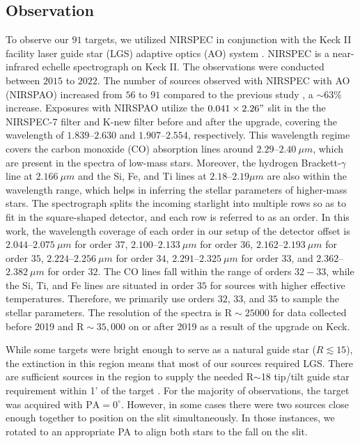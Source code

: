 \documentclass[12pt]{ucsddissertation}
\begin{document}
\begin{CJK*}{UTF8}{gbsn}
\subsection{Observation}
\label{onc-subsec:observation}

To observe our $91$ targets, we utilized NIRSPEC in conjunction with the Keck II facility laser guide star (LGS) adaptive optics (AO) system \citep[][]{McLean-1998, McLean-2000, vanDam-2006, Wizinowich-2006, Martin-2018}. NIRSPEC is a near-infrared echelle spectrograph on Keck II. The observations were conducted between $2015$ to $2022$. The number of sources observed with NIRSPEC with AO (NIRSPAO) increased from $56$ to $91$ compared to the previous study , a $\sim63\%$ increase.  Exposures with NIRSPAO utilize the $0.041\times2.26"$ slit in the the NIRSPEC-7 filter and K-new filter before and after the upgrade, covering the wavelength of $1.839$--$2.630$ and $1.907$--$2.554$, respectively. This wavelength regime covers the carbon monoxide (CO) absorption lines around $2.29$--$2.40~\mu m$, which are present in the spectra of low-mass stars. Moreover, the hydrogen Brackett-$\gamma$ line at $2.166~\mu m$ and the Si, Fe, and Ti lines at $2.18$--$2.19\mu m$ are also within the wavelength range, which helps in inferring the stellar parameters of higher-mass stars. The spectrograph splits the incoming starlight into multiple rows so as to fit in the square-shaped detector, and each row is referred to as an order. In this work, the wavelength coverage of each order in our setup of the detector offset is $2.044$--$2.075~\mu m$ for order $37$, $2.100$--$2.133~\mu m$ for order $36$, $2.162$--$2.193~\mu m$ for order $35$, $2.224$--$2.256~\mu m$ for order $34$, $2.291$--$2.325~\mu m$ for order $33$, and $2.362$--$2.382~\mu m$ for order $32$. The CO lines fall within the range of orders $32-33$, while the Si, Ti, and Fe lines are situated in order $35$ for sources with higher effective temperatures. Therefore, we primarily use orders $32$, $33$, and $35$ to sample the stellar parameters.  The resolution of the spectra is $\mathrm{R}\sim25000$ for data collected before 2019 and $\mathrm{R}\sim35,000$ on or after 2019 as a result of the upgrade on Keck.

While some targets were bright enough to serve as a natural guide star ($R\lesssim15$), the extinction in this region means that most of our sources required LGS.  There are sufficient sources in the region to supply the needed R$\sim$18 tip/tilt guide star requirement within 1' of the target \citep{Wizinowich-2006}.  For the majority of observations, the target was acquired with $\mathrm{PA}=0^\circ$.  However, in some cases there were two sources close enough together to position on the slit simultaneously.  In those instances, we rotated to an appropriate PA to align both stars to the fall on the slit.  


\end{CJK*}
\end{document}
